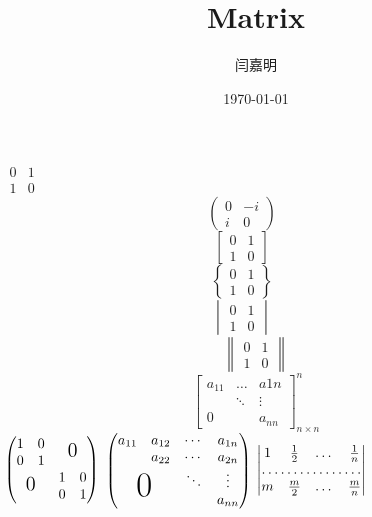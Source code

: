 \documentclass[UTF8]{ctexart}
\title{\heiti Matrix}
\author{\kaishu 闫嘉明}
\date{\heiti \today}
\begin{document}
\maketitle
$
\begin{matrix}
    0 & 1 \\
    1 & 0
\end{matrix} \qquad
$
\[
\begin{pmatrix}
    0 & -i \\
    i & 0
\end{pmatrix} \qquad
\]
\[
\begin{bmatrix}
    0 & 1 \\
    1 & 0
\end{bmatrix} \qquad
\]
\[
\begin{Bmatrix}
    0 & 1 \\
    1 & 0
\end{Bmatrix} \qquad
\]
\[
\begin{vmatrix}
    0 & 1 \\
    1 & 0
\end{vmatrix} \qquad
\]
\[
\begin{Vmatrix}
    0 & 1 \\
    1 & 0
\end{Vmatrix}
\]
$$
\begin{bmatrix}
    a_{11} & \dots & a{1n} \\
    & \ddots & \vdots \\
    0 & & a_{nn}
\end{bmatrix}_{n \times n}^n
$$
$
\begin{pmatrix}
    \begin{matrix} 1 & 0\\0 & 1 \end{matrix} & \text{\Large 0}\\
    \text{\Large 0} & \begin{matrix} 1 & 0\\0 & 1 \end{matrix}
\end{pmatrix}
$
$
\begin{pmatrix}
    a_{11} & a_{12} & \cdots & a_{1n}\\
    & a_{22} & \cdots &a_{2n}\\
    & & \ddots & \vdots\\
    \multicolumn{2}{c}{\raisebox{1.3ex}[0pt]{\Huge 0}} & & a_{nn}
\end{pmatrix}
$
$
\begin{vmatrix}
    1 & \frac 12 & \dots & \frac 1n \\
    \hdotsfor{4}\\
    m & \frac m2 & \dots & \frac mn
\end{vmatrix}
$
\end{document}
